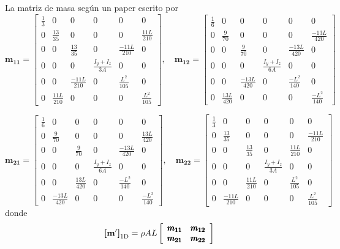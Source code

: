 La matriz de masa según un paper escrito por \cite{matas2014study}
\[ \pmb{m_{11}}=
\left[\begin{array}{cccccc}{\frac{1}{3}} & {0} & {0} & {0} & {0} & {0} \\ {0} & {\frac{13}{35}} & {0} & {0} & {0} & {\frac{11 L}{210}} \\ {0} & {0} & {\frac{13}{35}} & {0} & {\frac{-11 L}{210}} & {0} \\ {0} & {0} & {0} & {\frac{I_{y}+I_{z}}{3 A}} & {0} & {0} \\ {0} & {0} & {\frac{-11 L}{210}} & {0} & {\frac{L^{2}}{105}} & {0} \\ {0} & {\frac{11 L}{210}} & {0} & {0} & {0} & {\frac{L^{2}}{105}}\end{array}\right], \quad \pmb{m_{12}}= \left[\begin{array}{cccccc}{\frac{1}{6}} & {0} & {0} & {0} & {0} & {0} \\ {0} & {\frac{9}{70}} & {0} & {0} & {0} & {\frac{-13 L}{420}} \\ {0} & {0} & {\frac{9}{70}} & {0} & {\frac{-13 L}{420}} & {0} \\ {0} & {0} & {0} & {\frac{I_{y}+I_{z}}{6 A}} & {0} & {0} \\ {0} & {0} & {\frac{-13 L}{420}} & {0} & {\frac{-L^{2}}{140}} & {0} \\ {0} & {\frac{13 L}{420}} & {0} & {0} & {0} & {\frac{-L^{2}}{140}}\end{array}\right]
\]

\[
\pmb{m_{21}} = \left[\begin{array}{cccccc}{\frac{1}{6}} & {0} & {0} & {0} & {0} & {0} \\ {0} & {\frac{9}{70}} & {0} & {0} & {0} & {\frac{13 L}{420}} \\ {0} & {0} & {\frac{9}{70}} & {0} & {\frac{-13 L}{420}} & {0} \\ {0} & {0} & {0} & {\frac{I_{y}+I_{z}}{6 A}} & {0} & {0} \\ {0} & {0} & {\frac{13 L}{420}} & {0} & {\frac{-L^{2}}{140}} & {0} \\ {0} & {\frac{-13 L}{420}} & {0} & {0} & {0} & {\frac{-L^{2}}{140}}\end{array}\right], \quad \pmb{m_{22}} = \left[\begin{array}{cccccc}{\frac{1}{3}} & {0} & {0} & {0} & {0} & {0} \\ {0} & {\frac{13}{35}} & {0} & {0} & {0} & {\frac{-11 L}{210}} \\ {0} & {0} & {\frac{13}{35}} & {0} & {\frac{11 L}{210}} & {0} \\ {0} & {0} & {0} & {\frac{I_{y}+I_{z}}{3 A}} & {0} & {0} \\ {0} & {0} & {\frac{11 L}{210}} & {0} & {\frac{L^{2}}{105}} & {0} \\ {0} & {\frac{-11 L}{210}} & {0} & {0} & {0} & {\frac{L^{2}}{105}}\end{array}\right]
\]
donde
\begin{equation}
	\boldsymbol{[}\mathbf{m'} \boldsymbol{]}_{\mathrm{1D}}= \rho A L \left[\begin{array}{cc}
	\pmb{m_{11}}  &  \pmb{m_{12}} \\
	\pmb{m_{21}}  &  \pmb{m_{22}} 
	\end{array}\right]
\end{equation}
